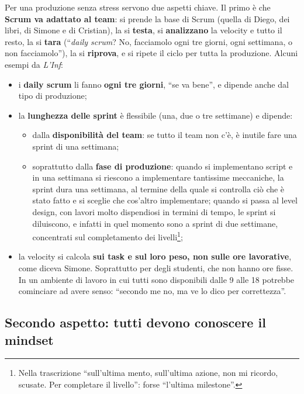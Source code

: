 Per una produzione senza stress servono due aspetti chiave. Il primo è che
\textbf{Scrum va adattato al team}: si prende la base di Scrum (quella di Diego,
dei libri, di Simone e di Cristian), la si \textbf{testa}, si \textbf{analizzano}
la velocity e tutto il resto, la si \textbf{tara} (``\emph{daily scrum}? No,
facciamolo ogni tre giorni, ogni settimana, o non facciamolo''), la si
\textbf{riprova}, e si ripete il ciclo per tutta la produzione. Alcuni esempi da
\emph{L'Inf}:
\begin{itemize}
  \item i \textbf{daily scrum} li fanno \textbf{ogni tre giorni}, ``se va
        bene'', e dipende anche dal tipo di produzione;
  \item la \textbf{lunghezza delle sprint} è flessibile (una, due o tre
        settimane) e dipende:
        \begin{itemize}
          \item dalla \textbf{disponibilità del team}: se tutto il team non
                c'è, è inutile fare una sprint di una settimana;
          \item soprattutto dalla \textbf{fase di produzione}: quando si
                implementano script e in una settimana si riescono a
                implementare tantissime meccaniche, la sprint dura una
                settimana, al termine della quale si controlla ciò che è stato
                fatto e si sceglie che cos'altro implementare; quando si passa al
                level design, con lavori molto dispendiosi in termini di tempo,
                le sprint si diluiscono, e infatti in quel momento sono a sprint
                di due settimane, concentrati sul completamento dei
                livelli\footnote{Nella trascrizione ``sull'ultima mento,
                sull'ultima azione, non mi ricordo, scusate. Per completare il
                livello'': forse ``l'ultima milestone''.};
        \end{itemize}
  \item la velocity si calcola \textbf{sui task e sul loro peso, non sulle ore
        lavorative}, come diceva Simone. Soprattutto per degli studenti, che
        non hanno ore fisse. In un ambiente di lavoro in cui tutti sono
        disponibili dalle 9 alle 18 potrebbe cominciare ad avere senso:
        ``secondo me no, ma ve lo dico per correttezza''.
\end{itemize}

\subsection{Secondo aspetto: tutti devono conoscere il mindset}

